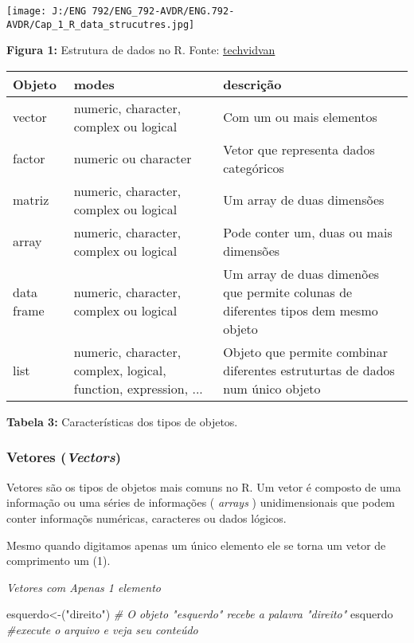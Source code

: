 \documentclass[
]{book}
\newenvironment{Shaded}{\begin{snugshade}}{\end{snugshade}}
\newcommand{\CommentTok}[1]{\textcolor[rgb]{0.56,0.35,0.01}{\textit{#1}}}
\newcommand{\NormalTok}[1]{#1}
\newcommand{\OtherTok}[1]{\textcolor[rgb]{0.56,0.35,0.01}{#1}}
\newcommand{\StringTok}[1]{\textcolor[rgb]{0.31,0.60,0.02}{#1}}
\begin{document}
\texttt{[image: J:/ENG 792/ENG\_792-AVDR/ENG.792-AVDR/Cap\_1\_R\_data\_strucutres.jpg]}

\textbf{Figura 1:} Estrutura de dados no R. Fonte: \href{https://techvidvan.com/tutorials/r-data-structures/}{techvidvan}

\begin{tabular}{l|l|l}
\hline
Objeto & modes & descrição\\
\hline
vector & numeric, character, complex ou logical & Com um ou  mais elementos\\
\hline
factor & numeric ou character & Vetor que representa dados categóricos\\
\hline
matriz & numeric, character, complex ou logical & Um array de duas dimensões\\
\hline
array & numeric, character, complex ou logical & Pode conter um, duas ou mais dimensões\\
\hline
data frame & numeric, character, complex ou logical & Um array de duas dimenões que permite colunas de diferentes tipos dem mesmo objeto\\
\hline
list & numeric, character, complex, logical, function, expression, ... & Objeto que permite combinar diferentes estruturtas de dados num único objeto\\
\hline
\end{tabular}

\textbf{Tabela 3:} Características dos tipos de objetos.

\hypertarget{vetores-vectors}{%
\subsubsection{\texorpdfstring{Vetores (\emph{Vectors})}{Vetores (Vectors)}}\label{vetores-vectors}}

Vetores são os tipos de objetos mais comuns no R. Um vetor é composto de uma informação ou uma séries de informações ( \emph{arrays} ) unidimensionais que podem conter informaçõs numéricas, caracteres ou dados lógicos.

Mesmo quando digitamos apenas um único elemento ele se torna um vetor de comprimento um (1).

\emph{Vetores com Apenas 1 elemento}

\begin{Shaded}
\begin{Highlighting}[]
\NormalTok{esquerdo}\OtherTok{\textless{}{-}}\NormalTok{(}\StringTok{"direito"}\NormalTok{) }\CommentTok{\# O objeto "esquerdo" recebe a palavra "direito"}
\NormalTok{esquerdo }\CommentTok{\#execute o arquivo e veja seu conteúdo}
\end{Highlighting}
\end{Shaded}
\end{document}
